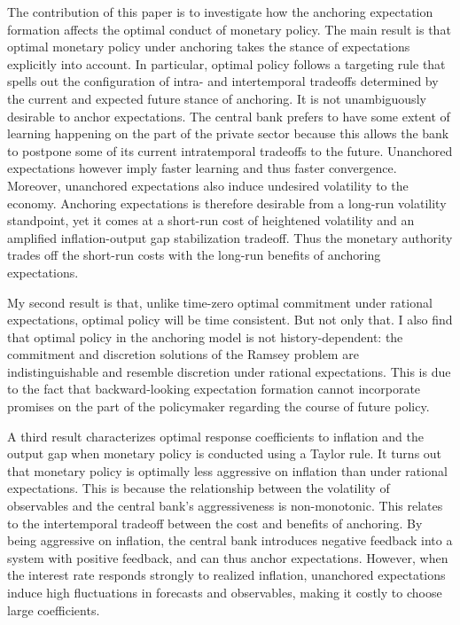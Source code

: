 \documentclass[11pt]{article}
\renewcommand{\[}{\begin{equation}}
\renewcommand{\]}{\end{equation}}
\begin{document}
The contribution of this paper is to investigate how the anchoring expectation formation affects the optimal conduct of monetary policy. The main result is that optimal monetary policy under anchoring takes the stance of expectations explicitly into account. In particular, optimal policy follows a targeting rule that spells out the configuration of intra- and intertemporal tradeoffs determined by the current and expected future stance of anchoring. It is not unambiguously desirable to anchor expectations. The central bank prefers to have some extent of learning happening on the part of the private sector because this allows the bank to postpone some of its current intratemporal tradeoffs to the future. Unanchored expectations however imply faster learning and thus faster convergence. Moreover, unanchored expectations also induce undesired volatility to the economy. Anchoring expectations is therefore desirable from a long-run volatility standpoint, yet it comes at a short-run cost of heightened volatility and an amplified inflation-output gap stabilization tradeoff. Thus the monetary authority trades off the short-run costs with the long-run benefits of anchoring expectations.

My second result is that, unlike time-zero optimal commitment under rational expectations, optimal policy will be time consistent. But not only that. I also find that optimal policy in the anchoring model is not history-dependent: the commitment and discretion solutions of the Ramsey problem are indistinguishable and resemble discretion under rational expectations. This is due to the fact that backward-looking expectation formation cannot incorporate promises on the part of the policymaker regarding the course of future policy.

A third result characterizes optimal response coefficients to inflation and the output gap when monetary policy is conducted using a Taylor rule. It turns out that monetary policy is optimally less aggressive on inflation than under rational expectations. This is because the relationship between the volatility of observables and the central bank's aggressiveness is non-monotonic. This relates to the intertemporal tradeoff between the cost and benefits of anchoring. By being aggressive on inflation, the central bank introduces negative feedback into a system with positive feedback, and can thus anchor expectations. However, when the interest rate responds strongly to realized inflation, unanchored expectations induce high fluctuations in forecasts and observables, making it costly to choose large coefficients. 
\end{document}
